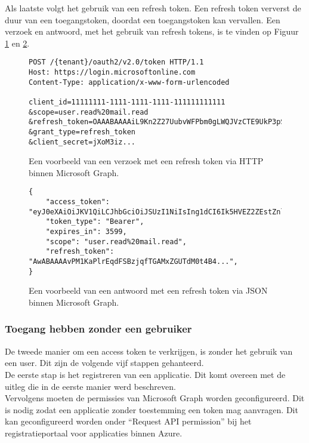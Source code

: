 Als laatste volgt het gebruik van een refresh token. Een refresh token ververst de duur van een toegangstoken, doordat een toegangstoken kan vervallen. Een verzoek en antwoord, met het gebruik van refresh tokens, is te vinden op Figuur \ref{MSGRTR} en \ref{MSGRTRES}.

\begin{figure}[!h]
    \footnotesize\begin{verbatim}
POST /{tenant}/oauth2/v2.0/token HTTP/1.1
Host: https://login.microsoftonline.com
Content-Type: application/x-www-form-urlencoded

client_id=11111111-1111-1111-1111-111111111111
&scope=user.read%20mail.read
&refresh_token=OAAABAAAAiL9Kn2Z27UubvWFPbm0gLWQJVzCTE9UkP3pSx1aXxUjq...
&grant_type=refresh_token
&client_secret=jXoM3iz...   
    \end{verbatim}    
    \caption[Voorbeeld Refresh Token request Microsoft Graph]{Een voorbeeld van een verzoek met een refresh token via \ac{HTTP} binnen Microsoft Graph.}
    \label{MSGRTR}
\end{figure}

\begin{figure}[!h]
    \footnotesize\begin{verbatim}
{
    "access_token": "eyJ0eXAiOiJKV1QiLCJhbGciOiJSUzI1NiIsIng1dCI6Ik5HVEZ2ZEstZnl0aEV1Q...",
    "token_type": "Bearer",
    "expires_in": 3599,
    "scope": "user.read%20mail.read",
    "refresh_token": "AwABAAAAvPM1KaPlrEqdFSBzjqfTGAMxZGUTdM0t4B4...",
}    
    \end{verbatim}    
    \caption[Voorbeeld Refresh Token response Microsoft Graph]{Een voorbeeld van een antwoord met een refresh token via \ac{JSON} binnen Microsoft Graph.}
    \label{MSGRTRES}
\end{figure}



\subsubsection{Toegang hebben zonder een gebruiker}

De tweede manier om een access token te verkrijgen, is zonder het gebruik van een user. Dit zijn de volgende vijf stappen gehanteerd. \\

De eerste stap is het registreren van een applicatie. Dit komt overeen met de uitleg die in de eerste manier werd beschreven. \\

Vervolgens moeten de permissies van Microsoft Graph worden geconfigureerd. Dit is nodig zodat een applicatie zonder toestemming een token mag aanvragen. Dit kan geconfigureerd worden onder “Request \ac{API} permission” bij het registratieportaal voor applicaties binnen Azure. \\

